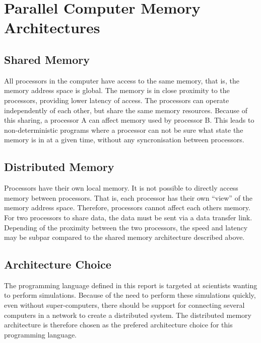 \chapter{Parallel Computer Memory Architectures}

\section{Shared Memory}

All processors in the computer have access to the same memory, that is, the memory address space is global. The memory is in close proximity to the processors, providing lower latency of access. The processors can operate independently of each other, but share the same memory resources. Because of this sharing, a processor A can affect memory used by processor B. This leads to non-deterministic programs where a processor can not be sure what state the memory is in at a given time, without any syncronisation between processors.

\section{Distributed Memory}

Processors have their own local memory. It is not possible to directly access memory between processors. That is, each processor has their own \enquote{view} of the memory address space. Therefore, processors cannot affect each others memory. For two processors to share data, the data must be sent via a data transfer link. Depending of the proximity between the two processors, the speed and latency may be subpar compared to the shared memory architecture described above.

\section{Architecture Choice}

The programming language defined in this report is targeted at scientists wanting to perform simulations. Because of the need to perform these simulations quickly, even without super-computers, there should be support for connecting several computers in a network to create a distributed system. The distributed memory architecture is therefore chosen as the prefered architecture choice for this programming language.